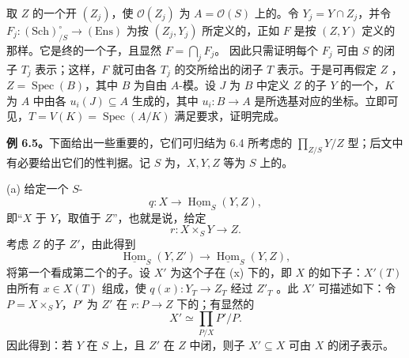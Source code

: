 取 $Z$ 的一个开 $(Z_j)$，使 $\mathcal O(Z_j)$ 为 $A=\mathcal O(S)$ 上的。令 $Y_j=Y\cap Z_j$，并令 $F_j:(\mathrm{Sch})_{/S}^{\circ}\to(\mathrm{Ens})$ 为按 $(Z_j,Y_j)$ 所定义的，正如 $F$ 是按 $(Z,Y)$ 定义的那样。它是终的一个子，且显然 $F=\bigcap_jF_j$。
因此只需证明每个 $F_j$ 可由 $S$ 的闭子 $T_j$ 表示；这样，$F$ 就可由各 $T_j$ 的交所给出的闭子 $T$ 表示。于是可再假定 $Z$ ，$Z=\operatorname{Spec}(B)$，其中 $B$ 为自由 $A$-模。设 $J$ 为 $B$ 中定义 $Z$ 的子 $Y$ 的一个，$K$ 为 $A$ 中由各 $u_i(J)\subseteq A$ 生成的，其中 $u_i:B\to A$ 是所选基对应的坐标。立即可见，$T=V(K)=\operatorname{Spec}(A/K)$ 满足要求，证明完成。

\textbf{例 6.5。}下面给出一些重要的，它们可归结为 6.4 所考虑的 $\prod_{Z/S}Y/Z$ 型；后文中有必要给出它们的性判据。记 $S$ 为，$X,Y,Z$ 等为 $S$ 上的。

(a) 给定一个 $S$-
\[
q:X\longrightarrow\underline{\operatorname{Hom}}_S(Y,Z),\tag{x}
\]
即“$X$ 于 $Y$，取值于 $Z$”，也就是说，给定
\[
r:X\times_SY\longrightarrow Z.\tag{xx}
\]
考虑 $Z$ 的子 $Z'$，由此得到
\[
\underline{\operatorname{Hom}}_S(Y,Z')\longrightarrow\underline{\operatorname{Hom}}_S(Y,Z),
\]
将第一个看成第二个的子。设 $X'$ 为这个子在 (x) 下的，即 $X$ 的如下子：$X'(T)$ 由所有 $x\in X(T)$ 组成，使 $q(x):Y_T\to Z_T$ 经过 $Z'_T$ 。此 $X'$ 可描述如下：令 $P=X\times_SY$，$P'$ 为 $Z'$ 在 $r:P\to Z$ 下的；有显然的
\[
X'\simeq\prod_{P/X}P'/P.\tag{xxx}
\]
因此得到：若 $Y$ 在 $S$ 上，且 $Z'$ 在 $Z$ 中闭，则子 $X'\subseteq X$ 可由 $X$ 的闭子表示。


